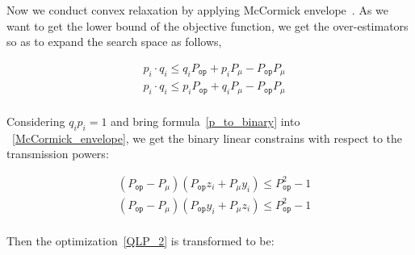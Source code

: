 \documentclass[times]{ettauth}
\theoremstyle{mytheoremstyle}
\theoremstyle{mytheoremstyle}
\theoremstyle{mytheoremstyle}
\begin{document}
Now we conduct convex relaxation by applying McCormick envelope~\cite{Mitsos2009}.
As we want to get the lower bound of the objective function, we get the over-estimators so as to expand the search space as follows,

	\begin{equation}
	\label{McCormick_envelope}	
	\begin{aligned}
& p_i \cdot q_i  \leq q_i P_{\mathtt{op}} + p_i P_\mu - P_{\mathtt{op}}P_\mu\\
& p_i \cdot q_i   \leq p_i P_{\mathtt{op}} + q_i P_\mu - P_{\mathtt{op}}P_\mu\\
   \end{aligned}
	\end{equation}
	

	
	Considering $q_i  p_i =1$ and bring formula~\ref{p_to_binary} into ~\ref{McCormick_envelope}, we get the binary linear constrains with respect to the transmission powers:
	
		\begin{equation}
	\label{relaxation_power}
	\begin{aligned}
	& (P_{\mathtt{op}} - P_\mu)(P_{\mathtt{op}} z_i + P_\mu y_i)  \leq P_{\mathtt{op}}^2 - 1\\
	& (P_{\mathtt{op}} - P_\mu)(P_{\mathtt{op}} y_i + P_\mu z_i)  \leq P_{\mathtt{op}}^2 - 1\\
   \end{aligned}
	\end{equation}	
	
Then the optimization~\ref{QLP_2} is transformed to be:
\end{document}

